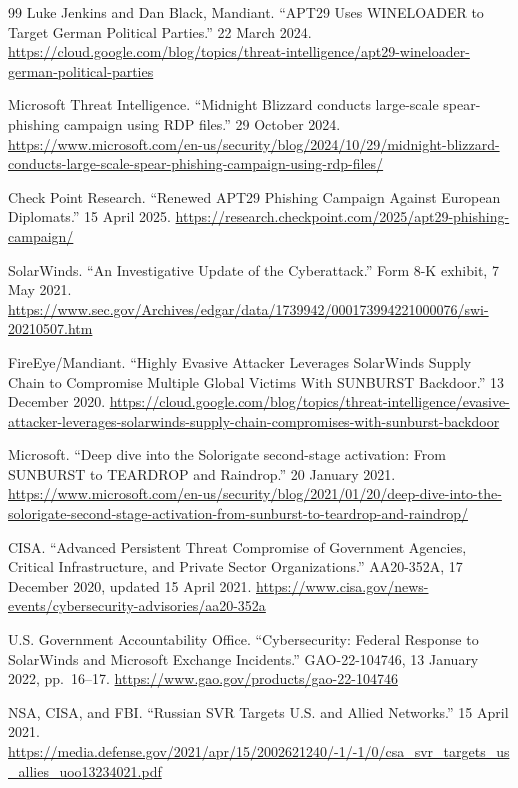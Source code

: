\begin{thebibliography}{99}
 Luke Jenkins and Dan Black, Mandiant. ``APT29 Uses WINELOADER to Target German Political Parties.'' 22 March 2024. \url{https://cloud.google.com/blog/topics/threat-intelligence/apt29-wineloader-german-political-parties}

 Microsoft Threat Intelligence. ``Midnight Blizzard conducts large-scale spear-phishing campaign using RDP files.'' 29 October 2024. \url{https://www.microsoft.com/en-us/security/blog/2024/10/29/midnight-blizzard-conducts-large-scale-spear-phishing-campaign-using-rdp-files/}

 Check Point Research. ``Renewed APT29 Phishing Campaign Against European Diplomats.'' 15 April 2025. \url{https://research.checkpoint.com/2025/apt29-phishing-campaign/}

 SolarWinds. ``An Investigative Update of the Cyberattack.'' Form 8-K exhibit, 7 May 2021. \url{https://www.sec.gov/Archives/edgar/data/1739942/000173994221000076/swi-20210507.htm}

 FireEye/Mandiant. ``Highly Evasive Attacker Leverages SolarWinds Supply Chain to Compromise Multiple Global Victims With SUNBURST Backdoor.'' 13 December 2020. \url{https://cloud.google.com/blog/topics/threat-intelligence/evasive-attacker-leverages-solarwinds-supply-chain-compromises-with-sunburst-backdoor}

 Microsoft. ``Deep dive into the Solorigate second-stage activation: From SUNBURST to TEARDROP and Raindrop.'' 20 January 2021. \url{https://www.microsoft.com/en-us/security/blog/2021/01/20/deep-dive-into-the-solorigate-second-stage-activation-from-sunburst-to-teardrop-and-raindrop/}

 CISA. ``Advanced Persistent Threat Compromise of Government Agencies, Critical Infrastructure, and Private Sector Organizations.'' AA20-352A, 17 December 2020, updated 15 April 2021. \url{https://www.cisa.gov/news-events/cybersecurity-advisories/aa20-352a}

 U.S. Government Accountability Office. ``Cybersecurity: Federal Response to SolarWinds and Microsoft Exchange Incidents.'' GAO-22-104746, 13 January 2022, pp.~16--17. \url{https://www.gao.gov/products/gao-22-104746}

 NSA, CISA, and FBI. ``Russian SVR Targets U.S. and Allied Networks.'' 15 April 2021. \url{https://media.defense.gov/2021/apr/15/2002621240/-1/-1/0/csa_svr_targets_us_allies_uoo13234021.pdf}


\end{thebibliography}
